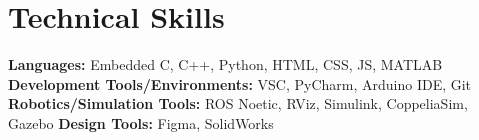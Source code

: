 \section*{Technical Skills}
%
%
%
\begin{tasks}
  \task \textbf{Languages:} Embedded C, C++, Python, HTML, CSS, JS, MATLAB
  \task \textbf{Development Tools/Environments:} VSC, PyCharm, Arduino IDE, Git
  \task \textbf{Robotics/Simulation Tools:} ROS Noetic, RViz, Simulink, CoppeliaSim, Gazebo
  \task \textbf{Design Tools:} Figma, SolidWorks
\end{tasks}